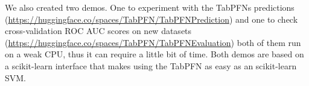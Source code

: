 \documentclass{article}
\begin{document}
We also created two demos. One to experiment with the TabPFNs predictions (\url{https://huggingface.co/spaces/TabPFN/TabPFNPrediction}) and one to check cross-validation ROC AUC scores on new datasets (\url{https://huggingface.co/spaces/TabPFN/TabPFNEvaluation}) both of them run on a weak CPU, thus it can require a little bit of time. Both demos are based on a scikit-learn interface that makes using the TabPFN as easy as an scikit-learn SVM.
\begin{table}[bt]
    \caption{Datasets used for the evaluation.}
    \label{table:test_datasets_table}
    \centering
    \tiny
    
\end{table}
\begin{table}[bt]
    \centering
    \caption{Meta-Datasets used for tuning the prior.}
    \tiny
    
    \label{table:reference_datasets_table}
\end{table}
\begin{table}[bt]
    \centering
    \caption{Meta-Datasets used for tuning the prior (continued).}
    \tiny
    
    \label{table:reference_datasets_table_2}
\end{table}
\begin{table}[bt]
    \centering
    \caption{Evaluation datasets for model generalization experiments.}
    \tiny
    
    \label{table:openml_datasets_table}
\end{table}
\end{document}
